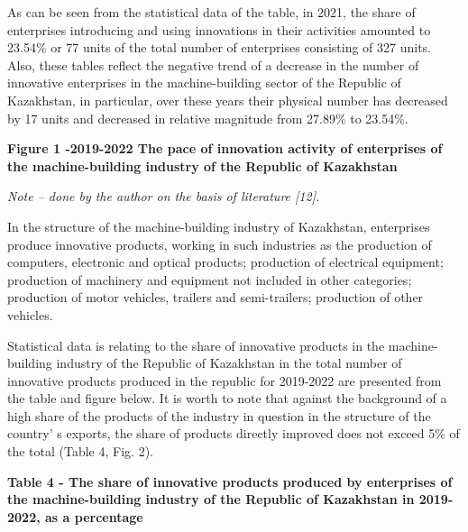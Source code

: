 {{As can be seen from the statistical data of the table, in 2021, the
share of enterprises introducing and using innovations in their
activities amounted to 23.54\% or 77 units of the total number of
enterprises consisting of 327 units. Also, these tables reflect the
negative trend of a decrease in the number of innovative enterprises in
the machine-building sector of the Republic of Kazakhstan, in
particular, over these years their physical number has decreased by 17
units and decreased in relative magnitude from 27.89\% to 23.54\%.

{\bfseries Figure 1 -2019-2022 The pace of innovation activity of
enterprises of the machine-building industry of the Republic of
Kazakhstan}

\emph{Note -- done by the author on the basis of literature {[}12{]}.}

In the structure of the machine-building industry of Kazakhstan,
enterprises produce innovative products, working in such industries as
the production of computers, electronic and optical products; production
of electrical equipment; production of machinery and equipment not
included in other categories; production of motor vehicles, trailers and
semi-trailers; production of other vehicles.

Statistical data is relating to the share of innovative products in the
machine-building industry of the Republic of Kazakhstan in the total
number of innovative products produced in the republic for 2019-2022 are
presented from the table and figure below. It is worth to note that
against the background of a high share of the products of the industry
in question in the structure of the country' s exports,
the share of products directly improved does not exceed 5\% of the total
(Table 4, Fig. 2).

{\bfseries Table 4 - The share of innovative products produced by
enterprises of the machine-building industry of the Republic of
Kazakhstan in 2019-2022, as a percentage}

}}
